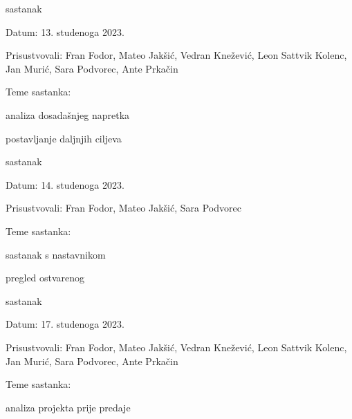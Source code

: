 \begin{packed_enum}
			\item  sastanak
			\item[] \begin{packed_item}
				\item Datum: {13. studenoga 2023.}
				\item Prisustvovali: {Fran Fodor, Mateo Jakšić, Vedran Knežević, Leon Sattvik Kolenc, Jan Murić, Sara Podvorec, Ante Prkačin}
				\item Teme sastanka:
				\begin{packed_item}
					\item  analiza dosadašnjeg napretka
					\item  postavljanje daljnjih ciljeva
				\end{packed_item}
			\end{packed_item}

			\item  sastanak
			\item[] \begin{packed_item}
				\item Datum: {14. studenoga 2023.}
				\item Prisustvovali: {Fran Fodor, Mateo Jakšić, Sara Podvorec}
				\item Teme sastanka:
				\begin{packed_item}
					\item  sastanak s nastavnikom
					\item  pregled ostvarenog
				\end{packed_item}
			\end{packed_item}

			\item  sastanak
			\item[] \begin{packed_item}
				\item Datum: {17. studenoga 2023.}
				\item Prisustvovali: {Fran Fodor, Mateo Jakšić, Vedran Knežević, Leon Sattvik Kolenc, Jan Murić, Sara Podvorec, Ante Prkačin}
				\item Teme sastanka:
				\begin{packed_item}
					\item  analiza projekta prije predaje
				\end{packed_item}
			\end{packed_item}


			
		\end{packed_enum}
		
